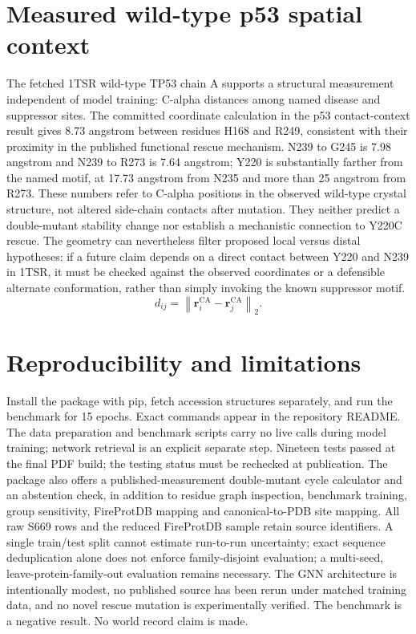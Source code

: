 \documentclass[11pt]{article}
\begin{document}
\section{Measured wild-type p53 spatial context}
The fetched 1TSR wild-type TP53 chain A supports a structural measurement independent of model training: C-alpha distances among named disease and suppressor sites. The committed coordinate calculation in the p53 contact-context result gives 8.73 angstrom between residues H168 and R249, consistent with their proximity in the published functional rescue mechanism. N239 to G245 is 7.98 angstrom and N239 to R273 is 7.64 angstrom; Y220 is substantially farther from the named motif, at 17.73 angstrom from N235 and more than 25 angstrom from R273. These numbers refer to C-alpha positions in the observed wild-type crystal structure, not altered side-chain contacts after mutation. They neither predict a double-mutant stability change nor establish a mechanistic connection to Y220C rescue. The geometry can nevertheless filter proposed local versus distal hypotheses: if a future claim depends on a direct contact between Y220 and N239 in 1TSR, it must be checked against the observed coordinates or a defensible alternate conformation, rather than simply invoking the known suppressor motif.
\begin{equation}d_{ij}=\left\|\mathbf r_i^{\mathrm{CA}}-\mathbf r_j^{\mathrm{CA}}\right\|_2.\end{equation}
\section{Reproducibility and limitations}
Install the package with pip, fetch accession structures separately, and run the benchmark for 15 epochs. Exact commands appear in the repository README. The data preparation and benchmark scripts carry no live calls during model training; network retrieval is an explicit separate step. Nineteen tests passed at the final PDF build; the testing status must be rechecked at publication. The package also offers a published-measurement double-mutant cycle calculator and an abstention check, in addition to residue graph inspection, benchmark training, group sensitivity, FireProtDB mapping and canonical-to-PDB site mapping. All raw S669 rows and the reduced FireProtDB sample retain source identifiers. A single train/test split cannot estimate run-to-run uncertainty; exact sequence deduplication alone does not enforce family-disjoint evaluation; a multi-seed, leave-protein-family-out evaluation remains necessary. The GNN architecture is intentionally modest, no published source has been rerun under matched training data, and no novel rescue mutation is experimentally verified. The benchmark is a negative result. No world record claim is made.
\end{document}
